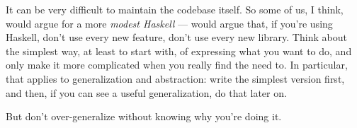 \begin{summary}
It can be very difficult to maintain the codebase itself. So some of us, I think, would argue for a more \emph{modest Haskell} — would argue that, if you're using Haskell, don't use every new feature, don't use every new library. Think about the simplest way, at least to start with, of expressing what you want to do, and only make it more complicated when you really find the need to. In particular, that applies to generalization and abstraction: write the simplest version first, and then, if you can see a useful generalization, do that later on.

But don't over-generalize without knowing why you're doing it.


\end{summary}

%
